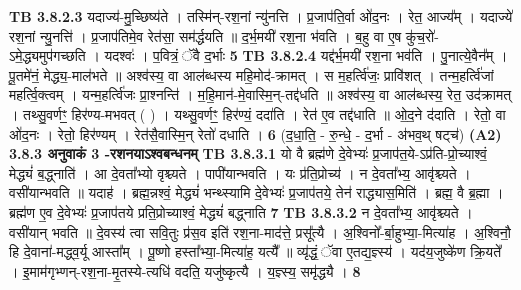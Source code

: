 \documentclass[17pt]{extarticle}
\begin{document}
{{{{{{{{{{{{{{{{{{{{{{                  \newline
                                \textbf{ TB 3.8.2.3} \newline
                  यदाज्य॑-मु॒च्छिष्य॑ते । तस्मि॑न्-रश॒नां न्यु॑नत्ति । प्र॒जाप॑ति॒र्वा ओ॑द॒नः । रेत॒ आज्य᳚म् । यदाज्ये॑ रश॒नां न्यु॒नत्ति॑ । प्र॒जाप॑तिमे॒व रेत॑सा॒ सम॑र्द्धयति ॥ द॒र्भ॒मयी॑ रश॒ना भ॑वति । ब॒हु वा ए॒ष कु॑च॒रो॑-ऽमे॒द्ध्यमुप॑गच्छति । यदश्वः॑ । प॒वित्रं॒ ॅवै द॒र्भाः \textbf{ 5} \newline
                  \newline
                                \textbf{ TB 3.8.2.4} \newline
                  यद्द॑र्भ॒मयी॑ रश॒ना भव॑ति । पु॒नात्ये॒वैन᳚म् । पू॒तमे॑नं॒ मेद्ध्य॒-माल॑भते ॥ अश्व॑स्य॒ वा आल॑ब्धस्य महि॒मोद॑-क्रामत् । स म॒हर्त्वि॑जः॒ प्रावि॑शत् । तन्म॒हर्त्वि॑जां महर्त्वि॒क्त्वम् । यन्म॒हर्त्वि॑जः प्रा॒श्नन्ति॑ । म॒हि॒मान॑-मे॒वास्मि॒न्-तद्द॑धति ॥ अश्व॑स्य॒ वा आल॑ब्धस्य॒ रेत॒ उद॑क्रामत् । तथ्सु॒वर्णꣳ॒॒ हिर॑ण्य-मभवत् ( ) । यथ्सु॒वर्णꣳ॒॒ हिर॑ण्यं॒ ददा॑ति । रेत॑ ए॒व तद्द॑धाति ॥ ओ॒द॒ने द॑दाति । रेतो॒ वा ओ॑द॒नः । रेतो॒ हिर॑ण्यम् । रेत॑सै॒वास्मि॒न् रेतो॑ दधाति । \textbf{ 6} \newline
                  \newline
                                    (द॒धा॒ति॒ - रु॒न्धे॒ - द॒र्भा - अ॑भव॒थ् षट्च॑) \textbf{(A2)} \newline \newline
                \textbf{ 3.8.3     अनुवाकं   3 -रशनयाऽश्वबन्धनम्} \newline
                                \textbf{ TB 3.8.3.1} \newline
                  यो वै ब्रह्म॑णे दे॒वेभ्यः॑ प्र॒जाप॑त॒ये-ऽप्र॑ति-प्रो॒च्याश्वं॒ मेद्ध्यं॑ ब॒द्ध्नाति॑ । आ दे॒वता᳚भ्यो वृश्च्यते । पापी॑यान्भवति । यः प्र॑ति॒प्रोच्य॑ । न दे॒वता᳚भ्य॒ आवृ॑श्च्यते । वसी॑यान्भवति ॥ यदाह॑ । ब्रह्म॒न्नश्वं॒ मेद्ध्यं॑ भन्थ्स्यामि दे॒वेभ्यः॑ प्र॒जाप॑तये॒ तेन॑ राद्ध्यास॒मिति॑ । ब्रह्म॒ वै ब्र॒ह्मा । ब्रह्म॑ण ए॒व दे॒वेभ्यः॑ प्र॒जाप॑तये प्रति॒प्रोच्याश्वं॒ मेद्ध्यं॑ बद्ध्नाति \textbf{ 7} \newline
                  \newline
                                \textbf{ TB 3.8.3.2} \newline
                  न दे॒वता᳚भ्य॒ आवृ॑श्च्यते । वसी॑यान् भवति ॥ दे॒वस्य॑ त्वा सवि॒तुः प्र॑स॒व इति॑ रश॒ना-माद॑त्ते॒ प्रसू᳚त्यै । अ॒श्विनो᳚-र्बा॒हुभ्या॒-मित्या॑ह । अ॒श्विनौ॒ हि दे॒वाना॑-मद्ध्व॒र्यू आस्ता᳚म् । पू॒ष्णो हस्ता᳚भ्या॒-मित्या॑ह॒ यत्यै᳚ ॥ व्यृ॑द्धं॒ ॅवा ए॒तद्य॒ज्ञ्स्य॑ । यद॑य॒जुष्के॑ण क्रि॒यते᳚ । इ॒माम॑गृभ्णन्-रश॒ना-मृ॒तस्ये-त्यधि॑ वदति॒ यजु॑ष्कृत्यै । य॒ज्ञ्स्य॒ समृ॑द्ध्यै । \textbf{ 8} \newline
}}}}}}}}}}}}}}}}}}}}}}
\end{document}
